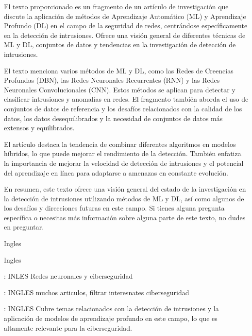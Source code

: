 \documentclass[11pt, a4paper]{article} %
\begin{document}
 El texto proporcionado es un fragmento de un artículo de investigación que discute la aplicación de métodos de Aprendizaje Automático (ML) y Aprendizaje Profundo (DL) en el campo de la seguridad de redes, centrándose específicamente en la detección de intrusiones. Ofrece una visión general de diferentes técnicas de ML y DL, conjuntos de datos y tendencias en la investigación de detección de intrusiones.

El texto menciona varios métodos de ML y DL, como las Redes de Creencias Profundas (DBN), las Redes Neuronales Recurrentes (RNN) y las Redes Neuronales Convolucionales (CNN). Estos métodos se aplican para detectar y clasificar intrusiones y anomalías en redes. El fragmento también aborda el uso de conjuntos de datos de referencia y los desafíos relacionados con la calidad de los datos, los datos desequilibrados y la necesidad de conjuntos de datos más extensos y equilibrados.

El artículo destaca la tendencia de combinar diferentes algoritmos en modelos híbridos, lo que puede mejorar el rendimiento de la detección. También enfatiza la importancia de mejorar la velocidad de detección de intrusiones y el potencial del aprendizaje en línea para adaptarse a amenazas en constante evolución.

En resumen, este texto ofrece una visión general del estado de la investigación en la detección de intrusiones utilizando métodos de ML y DL, así como algunos de los desafíos y direcciones futuras en este campo. Si tienes alguna pregunta específica o necesitas más información sobre alguna parte de este texto, no dudes en preguntar.


\citep{martinez2019machine} Ingles


\citep{sarker2022machine} Ingles


\citep{stamp2022artificial} : INLES Redes neuronales y ciberseguridad

\citep{haber2017data} : INGLES muchos articulos, filtrar interesnates ciberseguridad

\citep{kim2018network} : INGLES Cubre temas relacionados con la detección de intrusiones y la aplicación de modelos de aprendizaje profundo en este campo, lo que es altamente relevante para la ciberseguridad.
\end{document}

